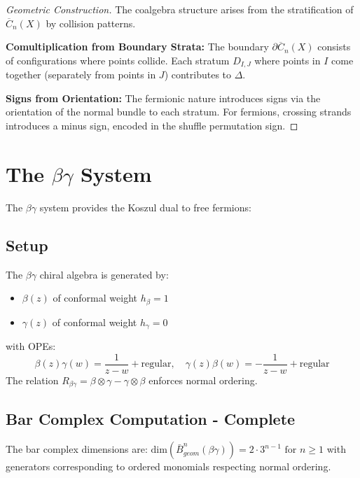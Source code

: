\begin{proof}[Geometric Construction]
The coalgebra structure arises from the stratification of $\overline{C}_n(X)$ by collision patterns.

\textbf{Comultiplication from Boundary Strata:} The boundary $\partial\overline{C}_n(X)$ consists of 
configurations where points collide. Each stratum $D_{I,J}$ where points in $I$ come together 
(separately from points in $J$) contributes to $\Delta$.

\textbf{Signs from Orientation:} The fermionic nature introduces signs via the orientation of 
the normal bundle to each stratum. For fermions, crossing strands introduces a minus sign, 
encoded in the shuffle permutation sign.
\end{proof}

\section{The $\beta\gamma$ System}
 
The $\beta\gamma$ system provides the Koszul dual to free fermions:
 
\subsection{Setup}
 
\begin{definition}
The $\beta\gamma$ chiral algebra is generated by:
\begin{itemize}
\item $\beta(z)$ of conformal weight $h_\beta = 1$
\item $\gamma(z)$ of conformal weight $h_\gamma = 0$
\end{itemize}
with OPEs:
\[
\beta(z)\gamma(w) = \frac{1}{z-w} + \text{regular}, \quad 
\gamma(z)\beta(w) = -\frac{1}{z-w} + \text{regular}
\]
The relation $R_{\beta\gamma} = \beta \otimes \gamma - \gamma \otimes \beta$ enforces normal ordering.
\end{definition}
 
\subsection{Bar Complex Computation - Complete}

\begin{theorem}
The bar complex dimensions are:
$\text{dim}(\bar{B}^n_{geom}(\beta\gamma)) = 2 \cdot 3^{n-1} \text{ for } n \geq 1$
with generators corresponding to ordered monomials respecting normal ordering.
\end{theorem}

